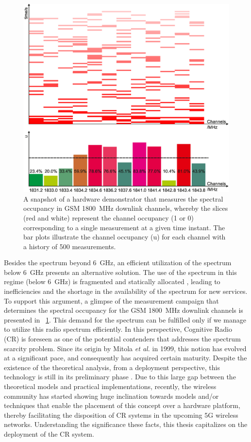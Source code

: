 \begin{figure}[!t]
\centering
\includegraphics[width = 0.9\columnwidth]{figures/Grafik_Poster}
\caption{A snapshot of a hardware demonstrator that measures the spectral occupancy in GSM \SI{1800}{MHz} downlink channels, whereby the slices (red and white) represent the channel occupancy (1 or 0) corresponding to a single measurement at a given time instant. The bar plots illustrate the channel occupancy (u) for each channel with a history of 500 measurements\protect{}.}
\label{fig:HW_I}
\end{figure}


Besides the spectrum beyond \SI{6}{GHz}, an efficient utilization of the spectrum below \SI{6}{GHz} presents an alternative solution. The use of the spectrum in this regime (below \SI{6}{GHz}) is fragmented and statically allocated \cite{Mchen05, Mchen07}, leading to inefficiencies and the shortage in the availability of the spectrum for new services. To support this argument, a glimpse of the measurement campaign that determines the spectral occupancy for the GSM \SI{1800}{MHz} downlink channels is presented in \figurename~\ref{fig:HW_I}. This demand for the spectrum can be fulfilled only if we manage to utilize this radio spectrum efficiently. In this perspective, Cognitive Radio (CR) is foreseen as one of the potential contenders that addresses the spectrum scarcity problem. Since its origin by Mitola \textit{et al.} in 1999, this notion has evolved at a significant pace, and consequently has acquired certain maturity. Despite the existence of the theoretical analysis, from a deployment perspective, this technology is still in its preliminary phase \cite{Pawe11}. Due to this large gap between the theoretical models and practical implementations, recently, the wireless community has started showing huge inclination towards models and/or techniques that enable the placement of this concept over a hardware platform, thereby facilitating the disposition of CR systems in the upcoming 5G wireless networks. Understanding the significance these facts, this thesis capitalizes on the deployment of the CR system. 


